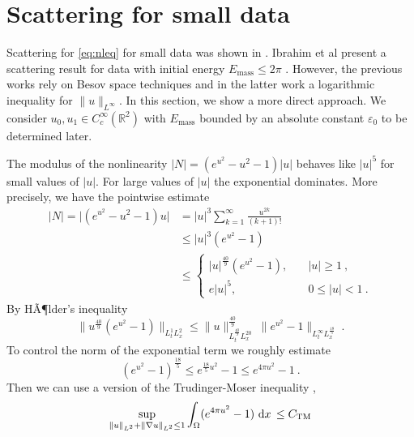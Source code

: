 \documentclass[a4paper]{amsart}
\providecommand{\abs}[1]{\lvert #1 \rvert}
\providecommand{\dint}[1]{ {\rm d} #1\,}
\providecommand{\norm}[1]{\lVert #1 \rVert}
\begin{document}
\section{Scattering for small data}
\label{sec:smalldata}

Scattering for \eqref{eq:nleq} for small data was shown in
\cite{MR1704989}. Ibrahim et al present a scattering result for data
with initial energy $E_{\textrm{mass}} \leq 2 \pi$ \cite{MR2569615}.
However, the previous works rely on Besov space techniques and in the
latter work a logarithmic inequality for $\norm{u}_{L^\infty}$. In this
section, we show a more direct approach. We consider $u_0, u_1 \in
C_c^\infty(\mathbb{R}^2)$ with $E_{\textrm{mass}}$ bounded by an
absolute constant ${\varepsilon}_0$ to be determined later.
\par
The modulus of the nonlinearity $\abs{N} = (e^{u^2} - u^2 - 1)
\abs{u}$ behaves like $\abs{u}^5$ for small values of $\abs{u}$. For
large values of $\abs{u}$ the exponential dominates. More precisely,
we have the pointwise estimate
\begin{equation}
  \begin{split}
    \abs{N}
    =
    \abs{(e^{u^2} - u^2 - 1) u}
    &=
    \abs{u}^3 \sum_{k=1}^\infty \frac{u^{2k}}{(k+1)!}
    \\
    &\leq
    \abs{u}^3 \left(e^{u^2} - 1\right)
    \\
    &\leq
    \begin{cases}
      \abs{u}^{\frac{40}{9}} \left(e^{u^2} - 1\right),\quad &\abs{u}\geq 1\ ,\\
      e \abs{u}^5,\quad &0 \leq \abs{u} < 1\ .
    \end{cases}
  \end{split}
  \label{eq:ptwwiseonN}
\end{equation}
By HÃ¶lder's inequality
\begin{equation*}
  \norm{u^{\frac{40}{9}} \left(e^{u^2} - 1\right)}_{L^1_t L^2_x}
  \leq
  \norm{u}^{\frac{40}{9}}_{L^{\frac{40}{9}}_t L^{20}_x}\ 
  \norm{e^{u^2} - 1}_{L^{\infty}_t L^{\frac{18}{5}}_x}\ .
\end{equation*}
To control the norm of the exponential term we roughly estimate
\begin{equation*}
  (e^{u^2} - 1)^{\frac{18}{5}}
  \leq
  e^{\frac{18}{5} u^2} - 1
  \leq
  e^{4 \pi u^2} - 1\ .
\end{equation*}
Then we can use a version of the Trudinger-Moser inequality
\cite{MR2109256},
\begin{equation}
  \sup_{\norm{u}_{L^2} + \norm{\nabla u}_{L^2} \leq 1}
  \int_\Omega (e^{4\pi u^2} - 1)\ \dint{x} \leq C_{\textrm{TM}}
  \label{eq:ruftrudinger}
\end{equation}
\end{document}
